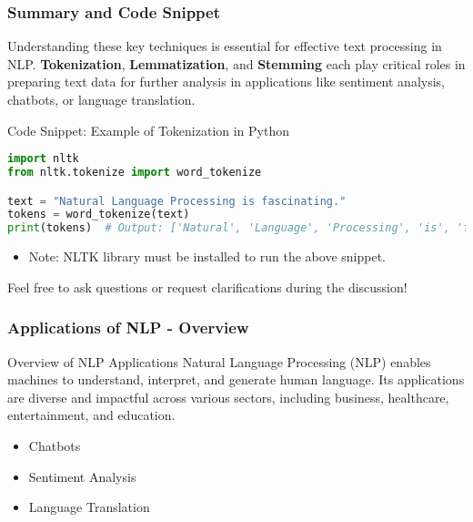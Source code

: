 \documentclass[aspectratio=169]{beamer}
\begin{document}
\begin{frame}[fragile]
    \frametitle{Summary and Code Snippet}
    Understanding these key techniques is essential for effective text processing in NLP. \textbf{Tokenization}, \textbf{Lemmatization}, and \textbf{Stemming} each play critical roles in preparing text data for further analysis in applications like sentiment analysis, chatbots, or language translation.

    \begin{block}{Code Snippet: Example of Tokenization in Python}
    \begin{lstlisting}[language=Python]
import nltk
from nltk.tokenize import word_tokenize

text = "Natural Language Processing is fascinating."
tokens = word_tokenize(text)
print(tokens)  # Output: ['Natural', 'Language', 'Processing', 'is', 'fascinating', '.']
    \end{lstlisting}
    \end{block}

    \begin{itemize}
        \item Note: NLTK library must be installed to run the above snippet.
    \end{itemize}

    Feel free to ask questions or request clarifications during the discussion!
\end{frame}

\begin{frame}[fragile]
    \frametitle{Applications of NLP - Overview}
    \begin{block}{Overview of NLP Applications}
        Natural Language Processing (NLP) enables machines to understand, interpret, and generate human language. Its applications are diverse and impactful across various sectors, including business, healthcare, entertainment, and education. 
    \end{block}
    \begin{itemize}
        \item Chatbots
        \item Sentiment Analysis
        \item Language Translation
    \end{itemize}
\end{frame}
\end{document}
